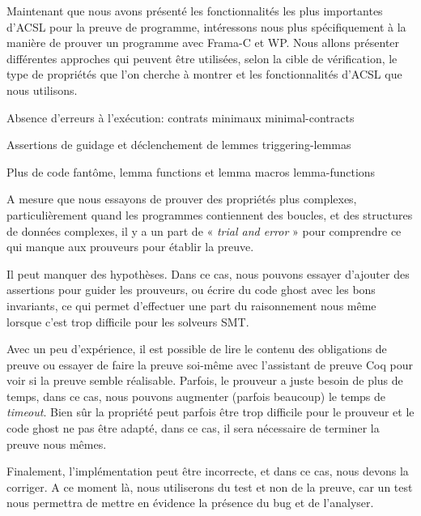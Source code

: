 Maintenant que  nous avons présenté les fonctionnalités les plus importantes
d'ACSL pour la preuve de programme, intéressons nous plus spécifiquement à la
manière de prouver un programme avec Frama-C et WP. Nous allons présenter
différentes approches qui peuvent être utilisées, selon la cible de vérification,
le type de propriétés que l'on cherche à montrer et les fonctionnalités d'ACSL
que nous utilisons.


\begin{levelTwo}
  {Absence d'erreurs à l'exécution: contrats minimaux}
  {minimal-contracts}
\end{levelTwo}

\begin{levelTwo}
  {Assertions de guidage et déclenchement de lemmes}
  {triggering-lemmas}
\end{levelTwo}

\begin{levelTwo}
  {Plus de code fantôme, lemma functions et lemma macros}
  {lemma-functions}
\end{levelTwo}



\horizontalLine
\newpage


A mesure que nous essayons de prouver des propriétés plus complexes,
particulièrement quand les programmes contiennent des boucles, et des
structures de données complexes, il y a un part de « \textit{trial and error} »
pour comprendre ce qui manque aux prouveurs pour établir la preuve.


Il peut manquer des hypothèses. Dans ce cas, nous pouvons essayer d'ajouter
des assertions pour guider les prouveurs, ou écrire du code ghost avec les
bons invariants, ce qui permet d'effectuer une part du raisonnement nous
même lorsque c'est trop difficile pour les solveurs SMT.


Avec un peu d'expérience, il est possible de lire le contenu des
obligations de preuve ou essayer de faire la preuve soi-même avec
l'assistant de preuve Coq pour voir si la preuve semble réalisable.
Parfois, le prouveur a juste besoin de plus de temps, dans ce cas, nous
pouvons augmenter (parfois beaucoup) le temps de \textit{timeout}. Bien
sûr la propriété peut parfois être trop difficile pour le prouveur et
le code ghost ne pas être adapté, dans ce cas, il sera nécessaire de
terminer la preuve nous mêmes.


Finalement, l'implémentation peut être incorrecte, et dans ce cas,
nous devons la corriger. A ce moment là, nous utiliserons du test et
non de la preuve, car un test nous permettra de mettre en évidence la
présence du bug et de l'analyser.
